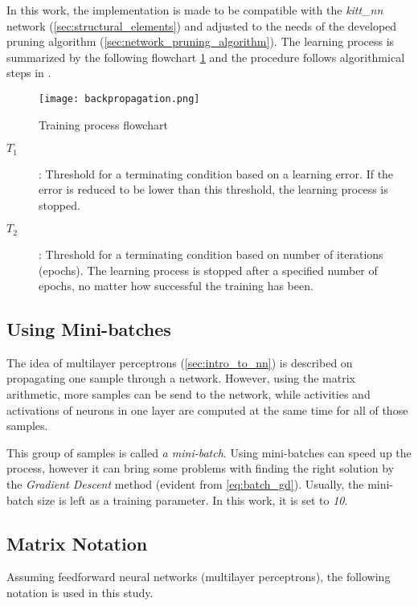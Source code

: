 In this work, the implementation is made to be compatible with the \textit{kitt\_nn} network (\cref{sec:structural_elements}) and adjusted to the needs of the developed pruning algorithm (\cref{sec:network_pruning_algorithm}). The learning process is summarized by the following flowchart \ref{img:backpropagation} and the procedure follows algorithmical steps in \citep{online:nn_demystified}.

\begin{figure}[H]
  \centering
  \texttt{[image: backpropagation.png]}
  \caption{Training process flowchart}
  \label{img:backpropagation}
\end{figure}

\begin{description}
\item[$ T_1 $] : Threshold for a terminating condition based on a learning error. If the error is reduced to be lower than this threshold, the learning process is stopped.
\item[$ T_2 $] : Threshold for a terminating condition based on number of iterations (epochs). The learning process is stopped after a specified number of epochs, no matter how successful the training has been.
\end{description}

\subsection{Using Mini-batches} \label{ssec:minibatches}
The idea of multilayer perceptrons (\cref{sec:intro_to_nn}) is described on propagating one sample through a network. However, using the matrix arithmetic, more samples can be send to the network, while activities and activations of neurons in one layer are computed at the same time for all of those samples.

This group of samples is called \textit{a mini-batch}. Using mini-batches can speed up the process, however it can bring some problems with finding the right solution by the \textit{Gradient Descent} method (evident from \cref{eq:batch_gd}). Usually, the mini-batch size is left as a training parameter. In this work, it is set to \textit{10}.

\subsection{Matrix Notation} \label{ssec:matrix_notation}
Assuming feedforward neural networks (multilayer perceptrons), the following notation is used in this study.

